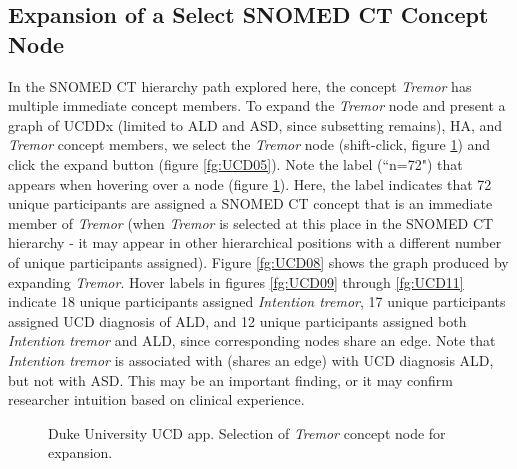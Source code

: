 \documentclass[10pt, letterpaper]{article}
\begin{document}
\begin{spacing}{1.0}
\subsection{Expansion of a Select SNOMED CT Concept Node}

In the SNOMED CT hierarchy path explored here, the concept \textit{Tremor} has multiple immediate concept members.  To expand the \textit{Tremor} node and present a graph of UCDDx (limited to ALD and ASD, since subsetting remains), HA, and \textit{Tremor} concept members, we select the \textit{Tremor} node (shift-click, figure \ref{fg:UCD07}) and click the expand button (figure \ref{fg:UCD05}).  Note the label (``n=72") that appears when hovering over a node (figure \ref{fg:UCD07}).  Here, the label indicates that 72 unique participants are assigned a SNOMED CT concept that is an immediate member of \textit{Tremor} (when \textit{Tremor} is selected at this place in the SNOMED CT hierarchy - it may appear in other hierarchical positions with a different number of unique participants assigned).  Figure \ref{fg:UCD08} shows the graph produced by expanding \textit{Tremor}.  Hover labels in figures \ref{fg:UCD09} through \ref{fg:UCD11} indicate 18 unique participants assigned \textit{Intention tremor}, 17 unique participants assigned UCD diagnosis of ALD, and 12 unique participants assigned both \textit{Intention tremor} and ALD, since corresponding nodes share an edge.  Note that \textit{Intention tremor} is associated with (shares an edge) with UCD diagnosis ALD, but not with ASD.  This may be an important finding, or it may confirm researcher intuition based on clinical experience.

\begin{figure}[H]
    \centering
    \caption{Duke University UCD app.  Selection of \textit{Tremor} concept node for expansion.}
    \label{fg:UCD07}
\end{figure}


\end{spacing}
\end{document}
